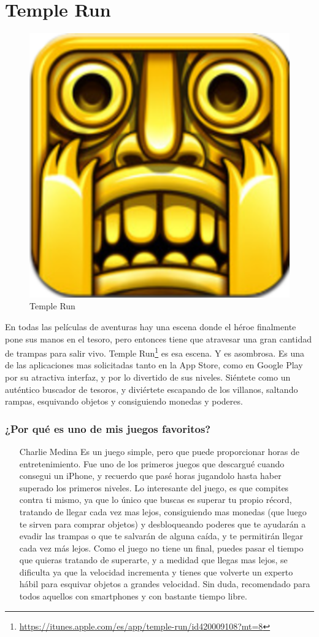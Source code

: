 \section{Temple Run}

\begin{figure}[htbp]
\begin{center}
\includegraphics[width=.35\textwidth]{./imagenes/templerun.png}
\caption{Temple Run}
\label{Temple Run}
\end{center}
\end{figure}
En todas las películas de aventuras hay una escena donde el héroe finalmente pone sus manos en el tesoro, pero entonces tiene que atravesar una gran cantidad de trampas para salir vivo. Temple Run\footnote{\url{https://itunes.apple.com/es/app/temple-run/id420009108?mt=8}} es esa escena. Y es asombrosa. Es una de las aplicaciones mas solicitadas tanto en la App Store, como en Google Play por su atractiva interfaz, y por lo divertido de sus niveles. Siéntete como un auténtico buscador de tesoros, y diviértete escapando de los villanos, saltando rampas, esquivando objetos y consiguiendo monedas y poderes.

\subsubsection{¿Por qué es uno de mis juegos favoritos?}
\begin{itemize}
\item[Charlie Medina] Es un juego simple, pero que puede proporcionar horas de entretenimiento. Fue uno de los primeros juegos que descargué cuando consegui un iPhone, y recuerdo que pasé horas jugandolo hasta haber superado los primeros niveles. Lo interesante del juego, es que compites contra ti mismo, ya que lo único que buscas es superar tu propio récord, tratando de llegar cada vez mas lejos, consiguiendo mas monedas (que luego te sirven para comprar objetos) y desbloqueando poderes que te ayudarán a evadir las trampas o que te salvarán de alguna caída, y te permitirán llegar cada vez más lejos. Como el juego no tiene un final, puedes pasar el tiempo que quieras tratando de superarte, y a medidad que llegas mas lejos, se dificulta ya que la velocidad incrementa y tienes que volverte un experto hábil para esquivar objetos a grandes velocidad. Sin duda, recomendado para todos aquellos con smartphones y con bastante tiempo libre.
\end{itemize}